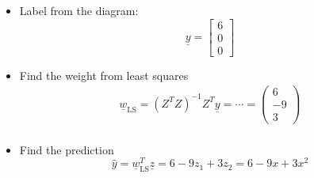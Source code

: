 \begin{example}
\begin{itemize}
                \item Label from the diagram:
                \begin{equation*}
                    \underline{y} = \begin{bmatrix} 6 \\ 0 \\ 0 \end{bmatrix}
                \end{equation*}

                \item Find the weight from least squares
                \begin{align*}
                    \underline{w}_{\text{LS}} = (Z^T Z)^{-1} Z^T \underline{y} = \cdots = \begin{pmatrix} 6 \\ -9 \\ 3 \end{pmatrix} \\
                \end{align*}
                
                \item Find the prediction
                \begin{equation*}
                    \hat{y} = \underline{w}_{\text{LS}}^T \underline{z} = 6 - 9z_1 + 3z_2 = 6 - 9x + 3x^2
                \end{equation*}
                
        \end{itemize}
    \end{example}


